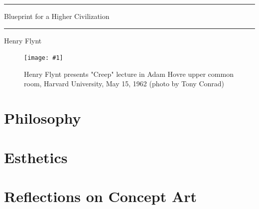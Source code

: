 \documentclass[10pt,twoside]{memoir}
\begin{document}
\frontmatter
\graphicspath{{img/}}
\pagestyle{ruled}
\openany

\renewcommand*{\cftpartfont}{\bfseries\scshape}
\renewcommand*{\cftchapterfont}{\normalfont}
\renewcommand*{\cftsectionfont}{\itshape}

\newcommand{\emt}[1]{\textit{#1}}

\thispagestyle{empty}
{
	\centering\sffamily

	\plainbreak{3}

	{ \Large
	Blueprint for a Higher Civilization \par}

	\plainbreak{3}

	{ \large Henry Flynt \par}
}

\clearpage

\newcommand{\photopage}[3]{
	\begin{figure}[!hp]
		\centering
		\texttt{[image: \#1]}
		\caption{#2 (photo by #3)}
	\end{figure}}

\photopage{img/creep}{Henry Flynt presents "Creep" lecture in Adam Hovre upper common room, Harvard University, May 15, 1962}{Tony Conrad}




\clearpage

\tableofcontents*

\clearpage

\mainmatter
\part{Philosophy}







\part{Esthetics}






\part{Reflections on Concept Art}


% 
% 
\end{document}
